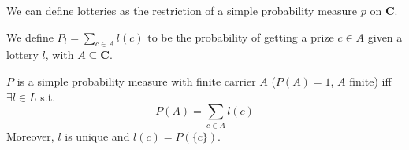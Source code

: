 \documentclass[12pt]{extarticle}
\begin{document}
We can define lotteries as the restriction of a simple probability measure $p$ on $\bm C$.

We define $P_l = \sum_{c \in A} l(c)$ to be the probability of getting a prize $c \in A$ given a lottery $l$, with $A \subseteq \bm C$.

\begin{proposition}{}{}
    $P$ is a simple probability measure with finite carrier $A$ ($P(A)=1$, $A$ finite) iff $\exists l \in L$ s.t.
    \begin{equation}
        P(A) = \sum_{c \in A} l(c)
    \end{equation}
    Moreover, $l$ is unique and $l(c) = P(\{c\})$.
\end{proposition}
\end{document}
